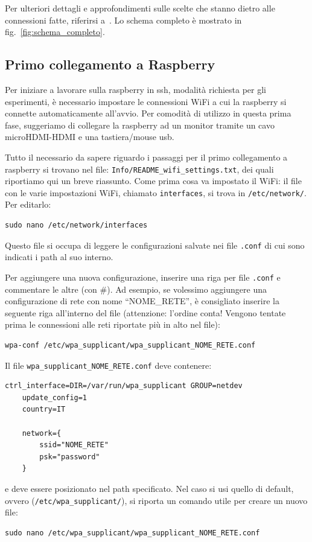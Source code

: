 Per ulteriori dettagli e approfondimenti sulle scelte che stanno dietro alle connessioni fatte, riferirsi a~\cite{ptvlocalizzazione}.
Lo schema completo è mostrato in fig.~\ref{fig:schema_completo}.

\subsection{Primo collegamento a Raspberry}
\label{sez: primo collegamento a raspberry}

Per iniziare a lavorare sulla raspberry in ssh, modalità richiesta per gli esperimenti, è necessario impostare le connessioni WiFi a cui la raspberry si
connette automaticamente all'avvio. 
Per comodità di utilizzo in questa prima fase, suggeriamo di collegare la raspberry ad un monitor tramite un cavo microHDMI-HDMI e una tastiera/mouse usb.

Tutto il necessario da sapere riguardo i passaggi per il primo collegamento a raspberry si trovano nel file: \texttt{Info/README\_wifi\_settings.txt}, dei quali 
riportiamo qui un breve riassunto.
Come prima cosa va impostato il WiFi: il file con le varie impostazioni WiFi, chiamato \texttt{interfaces}, si trova in \texttt{/etc/network/}. Per editarlo:
\begin{lstlisting}[style=bash]
	sudo nano /etc/network/interfaces
\end{lstlisting}
Questo file si occupa di leggere le configurazioni salvate nei file \texttt{.conf} di cui sono indicati i path al suo interno. 

Per aggiungere una nuova configurazione, inserire una riga per file \texttt{.conf} e commentare le altre (con \#).
Ad esempio, se volessimo aggiungere una configurazione di rete con nome ``NOME\_RETE'', \`e consigliato inserire la seguente riga all'interno del file 
(attenzione: l'ordine conta! Vengono tentate prima le connessioni alle reti riportate più in alto nel file):
\begin{lstlisting}[style=xml]
	wpa-conf /etc/wpa_supplicant/wpa_supplicant_NOME_RETE.conf
\end{lstlisting}
Il file \verb|wpa_supplicant_NOME_RETE.conf| deve contenere:
\begin{lstlisting}[style=xml]
	ctrl_interface=DIR=/var/run/wpa_supplicant GROUP=netdev
	update_config=1
	country=IT

	network={
		ssid="NOME_RETE"
		psk="password"
	}
\end{lstlisting}
e deve essere posizionato nel path specificato. 
Nel caso si usi quello di default, ovvero (\texttt{/etc/wpa\_supplicant/}), si riporta un comando utile per creare un nuovo file:
\begin{lstlisting}[style=bash]
	sudo nano /etc/wpa_supplicant/wpa_supplicant_NOME_RETE.conf
\end{lstlisting}

